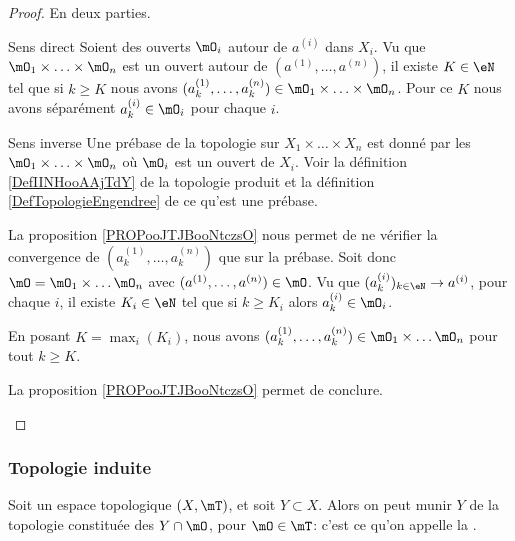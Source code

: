 \begin{proof}
    En deux parties.
    \begin{subproof}
        \item[Sens direct]
            Soient des ouverts \( \mO_i\) autour de \( a^{(i)}\) dans \( X_i\). Vu que \( \mO_1\times \ldots\times \mO_n\) est un ouvert autour de \( (a^{(1)},\ldots, a^{(n)})\), il existe \( K\in \eN\) tel que si \( k\geq K\) nous avons \( (a^{(1)}_k,\ldots, a^{(n)}_k)\in \mO_1\times \ldots \times \mO_n\). Pour ce \( K\) nous avons séparément \( a^{(i)}_k\in \mO_i\) pour chaque \( i\).

        \item[Sens inverse]
            Une prébase de la topologie sur \( X_1\times \ldots\times X_n\) est donné par les \( \mO_1\times \ldots \times \mO_n\) où \( \mO_i\) est un ouvert de \( X_i\). Voir la définition \ref{DefIINHooAAjTdY} de la topologie produit et la définition \ref{DefTopologieEngendree} de ce qu'est une prébase.

            La proposition \ref{PROPooJTJBooNtczsO} nous permet de ne vérifier la convergence de \( (a^{(1)}_k,\ldots, a^{(n)}_k)\) que sur la prébase. Soit donc \(\mO= \mO_1\times \ldots \mO_n\) avec \( (a^{(1)},\ldots, a^{(n)})\in \mO\). Vu que \( (a^{(i)}_k)_{k\in \eN}\to a^{(i)}\), pour chaque \( i\), il existe \( K_i\in \eN\) tel que si \( k\geq K_i\) alors \( a^{(i)}_k\in \mO_i\).

            En posant \( K=\max_i(K_i)\), nous avons \( (a^{(1)}_k,\ldots, a^{(n)}_k)\in \mO_1\times \ldots \mO_n\) pour tout \( k\geq K\).

            La proposition \ref{PROPooJTJBooNtczsO} permet de conclure.
    \end{subproof}
\end{proof}

\subsubsection{Topologie induite}

\begin{definition} \label{DefVLrgWDB}
  Soit un espace topologique \( (X, \mT) \), et soit \( Y \subset X \). Alors on peut munir \( Y \) de la topologie constituée des \( Y \cap \mO \), pour \( \mO \in \mT \): c'est ce qu'on appelle la .
\end{definition}

